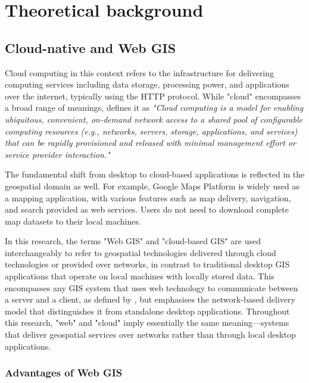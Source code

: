 \chapter{Theoretical background}
\label{chap:theoretical_background}

\section{Cloud-native and Web GIS}
\label{tb:cloud_native}
Cloud computing in this context refers to the infrastructure for delivering computing services including data storage, processing power, and applications over the internet, typically using the HTTP protocol. While "cloud" encompasses a broad range of meanings, \citet{nist_cloud_computing_2011} defines it as \emph{"Cloud computing is a model for enabling ubiquitous, convenient, on-demand network access to a shared pool of configurable computing resources (e.g., networks, servers, storage, applications, and services) that can be rapidly provisioned and released with minimal management effort or service provider interaction."}

The fundamental shift from desktop to cloud-based applications is reflected in the geospatial domain as well. For example, Google Maps Platform \citep{google_maps_platform} is widely used as a mapping application, with various features such as map delivery, navigation, and search provided as web services. Users do not need to download complete map datasets to their local machines.

In this research, the terms "Web GIS" and "cloud-based GIS" are used interchangeably to refer to geospatial technologies delivered through cloud technologies or provided over networks, in contrast to traditional desktop GIS applications that operate on local machines with locally stored data. This encompasses any GIS system that uses web technology to communicate between a server and a client, as defined by \citet{esri_webgis}, but emphasises the network-based delivery model that distinguishes it from standalone desktop applications. Throughout this research, "web" and "cloud" imply essentially the same meaning—systems that deliver geospatial services over networks rather than through local desktop applications.

\subsection{Advantages of Web GIS}
\label{tb:advantages_of_webgis}

